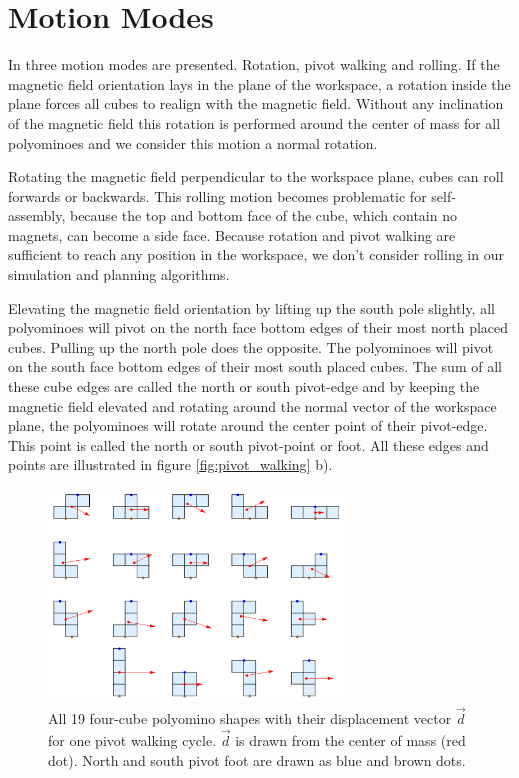 \section{Motion Modes}
In \cite{Bhattacharjee2022} three motion modes are presented. Rotation, pivot walking and rolling.
If the magnetic field orientation lays in the plane of the workspace, a rotation inside the plane forces all cubes to realign with the magnetic field.
Without any inclination of the magnetic field this rotation is performed around the center of mass for all polyominoes and we consider this motion a normal rotation.

Rotating the magnetic field perpendicular to the workspace plane, cubes can roll forwards or backwards.
This rolling motion becomes problematic for self-assembly, because the top and bottom face of the cube, which contain no magnets, can become a side face.
Because rotation and pivot walking are sufficient to reach any position in the workspace, we don't consider rolling in our simulation and planning algorithms.

Elevating the magnetic field orientation by lifting up the south pole slightly, all polyominoes will pivot on the north face bottom edges of their most north placed cubes.
Pulling up the north pole does the opposite. The polyominoes will pivot on the south face bottom edges of their most south placed cubes.
The sum of all these cube edges are called the north or south pivot-edge and by keeping the magnetic field elevated and rotating around the normal vector of the workspace plane, the polyominoes will rotate around the center point of their pivot-edge.
This point is called the north or south pivot-point or foot.
All these edges and points are illustrated in figure \ref{fig:pivot_walking} b).

\begin{figure}
	\centering
	\includegraphics[width=0.70\textwidth]{figures/displacement_pivot_walking.png}
	\caption{All 19 four-cube polyomino shapes with their displacement vector $\vec{d}$ for one pivot walking cycle. $\vec{d}$ is drawn from the center of mass (red dot). North and south pivot foot are drawn as blue and brown dots.}
	\label{fig:displacement_pivot_walking}
\end{figure}


